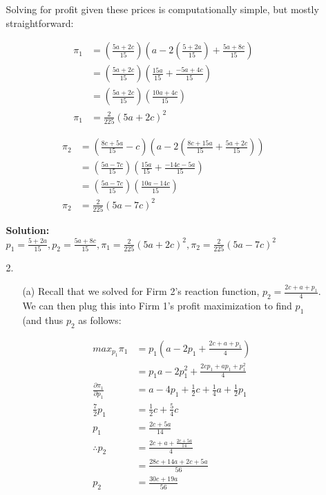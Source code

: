 \documentclass[12pt,letterpaper]{article}
\begin{document}
\begin{enumerate}
\begin{enumerate}
    Solving for profit given these prices is computationally simple, but mostly straightforward:

    \begin{align*}
        \pi_1 &= (\frac{5a+2c}{15})(a - 2 (\frac{5 + 2a}{15}) + \frac{5a + 8c}{15}) \\
        &= (\frac{5a+2c}{15})(\frac{15a}{15} + \frac{-5a + 4c}{15}) \\
        &= (\frac{5a + 2c}{15})(\frac{10a + 4c}{15}) \\
        \pi_1 &= \frac{2}{225}(5a + 2c)^2
    \end{align*}

    \begin{align*}
        \pi_2 &= (\frac{8c + 5a}{15} - c)(a - 2(\frac{8c + 15a}{15} + \frac{5a + 2c}{15})) \\
        &= (\frac{5a - 7c}{15})(\frac{15a}{15} + \frac{-14c - 5a}{15}) \\
        &= (\frac{5a - 7c}{15})(\frac{10a - 14c}{15}) \\
        \pi_2 &= \frac{2}{225}(5a-7c)^2
    \end{align*}

    {\color{blue}\textbf{Solution:} $p_1 = \frac{5 + 2a}{15}, p_2 = \frac{5a + 8c}{15}, \pi_1 = \frac{2}{225}(5a + 2c)^2, \pi_2 = \frac{2}{225}(5a-7c)^2$}
    \item[2.] 
    
    \begin{enumerate}
    
    \item[(a)] Recall that we solved for Firm 2's reaction function, $p_2 = \frac{2c + a + p_1}{4}$. We can then plug this into Firm 1's profit maximization to find $p_1$ (and thus $p_2$ as follows:
    
    \begin{align*}
        max_{p_1} \pi_1 &= p_1 (a - 2p_1 + \frac{2c + a + p_1}{4}) \\
        &= p_1 a - 2p_1^2 + \frac{2cp_1 + ap_1 + p_1^2}{4} \\
        \frac{\partial \pi_1}{\partial p_1} &= a - 4p_1 + \frac{1}{2}c + \frac{1}{4}a + \frac{1}{2}p_1 \\
        \frac{7}{2}p_1 &= \frac{1}{2}c + \frac{5}{4}c \\
        p_1 &= \frac{2c + 5a}{14} \\
        \therefore p_2 &= \frac{2c + a + \frac{2c + 5a}{14}}{4} \\
        &= \frac{28c + 14a + 2c + 5a}{56} \\
        p_2 &= \frac{30c + 19a}{56}
    \end{align*}


\end{enumerate}
\end{enumerate}
\end{enumerate}
\end{document}
